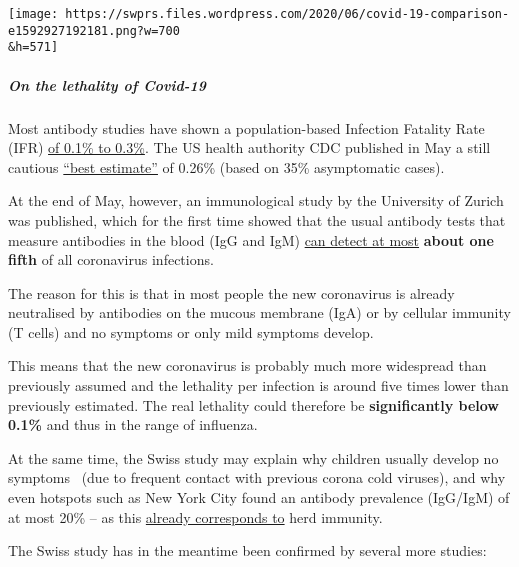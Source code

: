\texttt{[image: https://swprs.files.wordpress.com/2020/06/covid-19-comparison-e1592927192181.png?w=700\\\&h=571]}

\hypertarget{on-the-lethality-of-covid-19}{%
\subparagraph{\texorpdfstring{\textbf{On the lethality of
Covid-19}}{On the lethality of Covid-19}}\label{on-the-lethality-of-covid-19}}

Most antibody studies have shown a population-based Infection Fatality
Rate (IFR) \href{https://swprs.org/studies-on-covid-19-lethality/}{of
0.1\% to 0.3\%}. The US health authority CDC published in May a still
cautious
\href{https://reason.com/2020/05/24/the-cdcs-new-best-estimate-implies-a-covid-19-infection-fatality-rate-below-0-3/}{``best
estimate''} of 0.26\% (based on 35\% asymptomatic cases).

At the end of May, however, an immunological study by the University of
Zurich was published, which for the first time showed that the usual
antibody tests that measure antibodies in the blood (IgG and IgM)
\href{https://swprs.org/coronavirus-antibody-tests-show-only-one-fifth-of-infections/}{can
detect at most} \textbf{about one fifth} of all coronavirus infections.

The reason for this is that in most people the new coronavirus is
already neutralised by antibodies on the mucous membrane (IgA) or by
cellular immunity (T cells) and no symptoms or only mild symptoms
develop.

This means that the new coronavirus is probably much more widespread
than previously assumed and the lethality per infection is around five
times lower than previously estimated. The real lethality could
therefore be \textbf{significantly below 0.1\%} and thus in the range of
influenza.

At the same time, the Swiss study may explain why children usually
develop no symptoms~ (due to frequent contact with previous corona cold
viruses), and why even hotspots such as New York City found an antibody
prevalence (IgG/IgM) of at most 20\% -- as this
\href{https://theconversation.com/coronavirus-could-it-be-burning-out-after-20-of-a-population-is-infected-141584}{already
corresponds to} herd immunity.

The Swiss study has in the meantime been confirmed by several more
studies:

